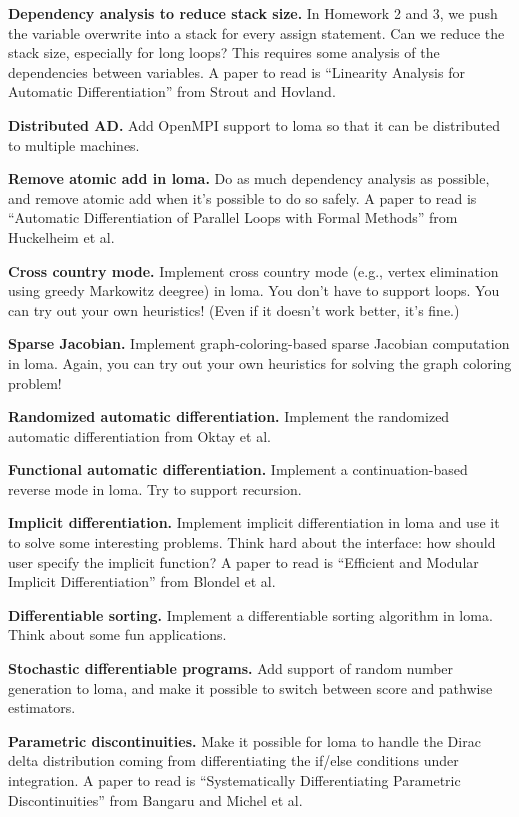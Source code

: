 \textbf{Dependency analysis to reduce stack size.} In Homework 2 and 3, we push the variable overwrite into a stack for every assign statement. Can we reduce the stack size, especially for long loops? This requires some analysis of the dependencies between variables. A paper to read is ``Linearity Analysis for Automatic Differentiation'' from Strout and Hovland.

\textbf{Distributed AD.} Add OpenMPI support to loma so that it can be distributed to multiple machines.

\textbf{Remove atomic add in loma.} Do as much dependency analysis as possible, and remove atomic add when it's possible to do so safely. A paper to read is ``Automatic Differentiation of Parallel Loops with Formal Methods'' from Huckelheim et al.

\textbf{Cross country mode.} Implement cross country mode (e.g., vertex elimination using greedy Markowitz deegree) in loma. You don't have to support loops. You can try out your own heuristics! (Even if it doesn't work better, it's fine.)

\textbf{Sparse Jacobian.} Implement graph-coloring-based sparse Jacobian computation in loma. Again, you can try out your own heuristics for solving the graph coloring problem!

\textbf{Randomized automatic differentiation.} Implement the randomized automatic differentiation from Oktay et al.

\textbf{Functional automatic differentiation.} Implement a continuation-based reverse mode in loma. Try to support recursion.

\textbf{Implicit differentiation.} Implement implicit differentiation in loma and use it to solve some interesting problems. Think hard about the interface: how should user specify the implicit function? A paper to read is ``Efficient and Modular Implicit Differentiation'' from Blondel et al.

\textbf{Differentiable sorting.} Implement a differentiable sorting algorithm in loma. Think about some fun applications.

\textbf{Stochastic differentiable programs.} Add support of random number generation to loma, and make it possible to switch between score and pathwise estimators.

\textbf{Parametric discontinuities.} Make it possible for loma to handle the Dirac delta distribution coming from differentiating the if/else conditions under integration. A paper to read is ``Systematically Differentiating Parametric Discontinuities'' from Bangaru and Michel et al.

